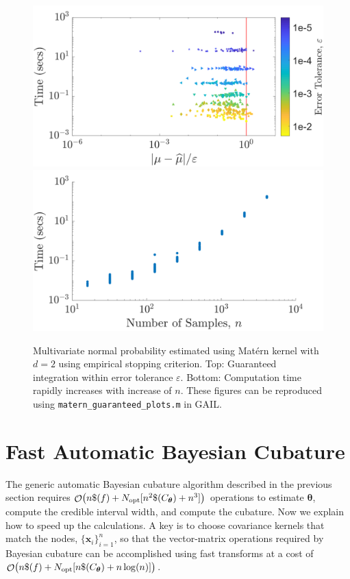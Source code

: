 \documentclass[twocolumn]{svjour3}          %
\DeclareMathOperator{\Order}{{\mathcal O}}
\newcommand{\bm}[1]{\boldsymbol{#1}}
\newcommand{\vtheta}{{\bm{\theta}}}
\newcommand{\vx}{\bm{x}}
\newcommand{\opt}{{\textup{opt}}}
\newcommand{\code}[1]{\texttt{#1}}
\begin{document}
\begin{figure}
	\centering
		\includegraphics[width=0.95\linewidth]{MVN_guaranteed_time_Matern_d2_2019-Jun-29}
	\centering
		\includegraphics[width=0.95\linewidth]{MVN_rapid_n_vs_time_Matern_d2_2019-Jun-29}
	\caption{Multivariate normal probability estimated using Mat\'ern kernel with $d=2$ using empirical stopping criterion. Top: Guaranteed integration within error tolerance $\varepsilon$. Bottom: Computation time rapidly increases with increase of $n$. These figures can be reproduced using \code{matern\_guaranteed\_plots.m} in GAIL.}
	\label{fig:MVN_Metern_d2b2}
\end{figure}

\section{Fast Automatic Bayesian Cubature}\label{sec:fast_BC}

The generic automatic Bayesian cubature algorithm described in the previous section requires $\Order\bigl(n \$(f) + \break N_{\opt} [n^2 \$(C_\vtheta)  + n^3]\bigr)$ operations to estimate $\vtheta$, compute the credible interval width, and compute the cubature. Now we explain how to speed up the calculations. A key is to choose covariance kernels that match the nodes, $\{\vx_i\}_{i=1}^n$, so that the vector-matrix operations required by Bayesian cubature can be accomplished using fast transforms at a cost of $\Order\bigl(n \$(f) + N_{\opt} [n \$(C_\vtheta)  + n \log(n)] \bigr)$.
\end{document}
